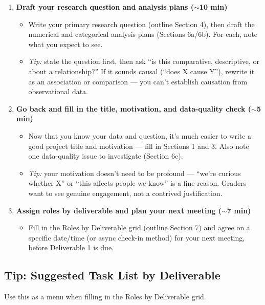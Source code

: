 \documentclass[12pt]{article}
\begin{document}
\begin{enumerate}
    \item \textbf{Draft your research question and analysis plans ($\sim$10 min)}
    \begin{itemize}
        \item Write your primary research question (outline Section 4), then draft the numerical and categorical analysis plans (Sections 6a/6b). For each, note what you expect to see.
        \item \emph{Tip:} state the question first, then ask ``is this comparative, descriptive, or about a relationship?'' If it sounds causal (``does X cause Y''), rewrite it as an association or comparison --- you can't establish causation from observational data.
    \end{itemize}

    \item \textbf{Go back and fill in the title, motivation, and data-quality check ($\sim$5 min)}
    \begin{itemize}
        \item Now that you know your data and question, it's much easier to write a good project title and motivation --- fill in Sections 1 and 3. Also note one data-quality issue to investigate (Section 6c).
        \item \emph{Tip:} your motivation doesn't need to be profound --- ``we're curious whether X'' or ``this affects people we know'' is a fine reason. Graders want to see genuine engagement, not a contrived justification.
    \end{itemize}

    \item \textbf{Assign roles by deliverable and plan your next meeting ($\sim$7 min)}
    \begin{itemize}
        \item Fill in the Roles by Deliverable grid (outline Section 7) and agree on a specific date/time (or async check-in method) for your next meeting, before Deliverable 1 is due.
    \end{itemize}
\end{enumerate}

\subsection*{Tip: Suggested Task List by Deliverable}

Use this as a menu when filling in the Roles by Deliverable grid.
\end{document}
